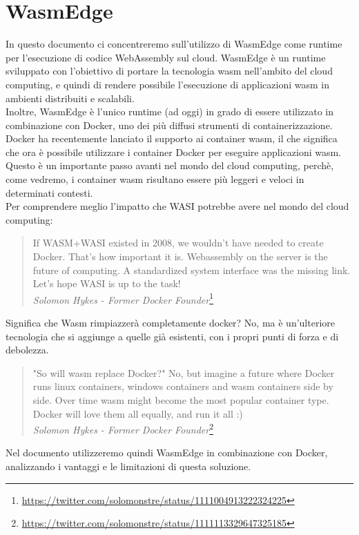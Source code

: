 \section{WasmEdge}
In questo documento ci concentreremo sull'utilizzo di WasmEdge come runtime per l'esecuzione di codice WebAssembly sul cloud. WasmEdge è un runtime sviluppato con l'obiettivo di portare la tecnologia wasm nell'ambito del cloud computing, e quindi di rendere possibile l'esecuzione di applicazioni wasm in ambienti distribuiti e scalabili.
\\
Inoltre, WasmEdge è l'unico runtime (ad oggi) in grado di essere utilizzato in combinazione con Docker, uno dei più diffusi strumenti di containerizzazione. Docker ha recentemente lanciato il supporto ai container wasm\cite{docker-wasm-tech-preview}, il che significa che ora è possibile utilizzare i container Docker per eseguire applicazioni wasm. Questo è un importante passo avanti nel mondo del cloud computing, perchè, come vedremo, i container wasm risultano essere più leggeri e veloci in determinati contesti.
\\
Per comprendere meglio l'impatto che WASI potrebbe avere nel mondo del cloud computing:
\begin{quote}
    If WASM+WASI existed in 2008, we wouldn't have needed to create Docker. That's how important it is. Webassembly on the server is the future of computing. A standardized system interface was the missing link. Let's hope WASI is up to the task!
    \\
    \textit{Solomon Hykes - Former Docker Founder}\footnote{\url{https://twitter.com/solomonstre/status/1111004913222324225}}
\end{quote}

Significa che Wasm rimpiazzerà completamente docker? No, ma è un'ulteriore tecnologia che si aggiunge a quelle già esistenti, con i propri punti di forza e di debolezza.
\begin{quote}
    "So will wasm replace Docker?" No, but imagine a future where Docker runs linux containers, windows containers and wasm containers side by side. Over time wasm might become the most popular container type. Docker will love them all equally, and run it all :)
    \\
    \textit{Solomon Hykes - Former Docker Founder}\footnote{\url{https://twitter.com/solomonstre/status/1111113329647325185}}
\end{quote}

Nel documento utilizzeremo quindi WasmEdge in combinazione con Docker, analizzando i vantaggi e le limitazioni di questa soluzione.